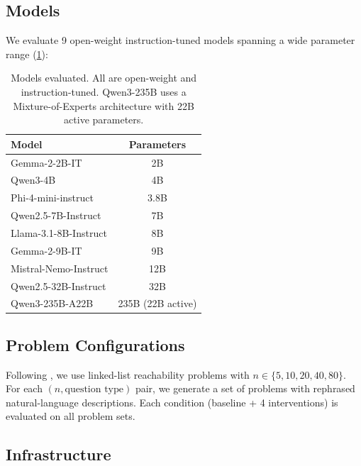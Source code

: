 \documentclass{article}
\theoremstyle{plain}
\theoremstyle{definition}
\theoremstyle{remark}
\begin{document}
\subsection{Models}

We evaluate 9 open-weight instruction-tuned models spanning a wide parameter range (\cref{tab:models}):

\begin{table}[t]
\caption{Models evaluated. All are open-weight and instruction-tuned. Qwen3-235B uses a Mixture-of-Experts architecture with 22B active parameters.}
\label{tab:models}
\begin{center}
\begin{small}
\begin{tabular}{lc}
\toprule
Model & Parameters \\
\midrule
Gemma-2-2B-IT \citep{team2024gemma} & 2B \\
Qwen3-4B \citep{yang2024qwen2} & 4B \\
Phi-4-mini-instruct \citep{abdin2024phi} & 3.8B \\
Qwen2.5-7B-Instruct \citep{yang2024qwen2} & 7B \\
Llama-3.1-8B-Instruct \citep{touvron2023llama} & 8B \\
Gemma-2-9B-IT \citep{team2024gemma} & 9B \\
Mistral-Nemo-Instruct \citep{jiang2023mistral} & 12B \\
Qwen2.5-32B-Instruct \citep{yang2024qwen2} & 32B \\
Qwen3-235B-A22B \citep{yang2024qwen2} & 235B (22B active) \\
\bottomrule
\end{tabular}
\end{small}
\end{center}
\vskip -0.1in
\end{table}

\subsection{Problem Configurations}

Following \citet{wu2026beyond}, we use linked-list reachability problems with $n \in \{5, 10, 20, 40, 80\}$. For each $(n, \text{question type})$ pair, we generate a set of problems with rephrased natural-language descriptions. Each condition (baseline + 4 interventions) is evaluated on all problem sets.

\subsection{Infrastructure}
\end{document}
